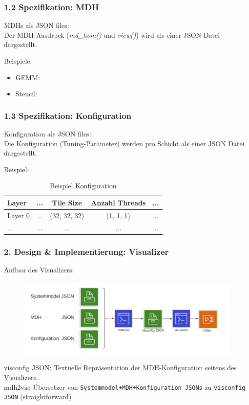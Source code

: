 \documentclass{presentation}
\begin{document}
\begin{frame}[allowframebreaks]
	\frametitle{1.2 Spezifikation: MDH}
	MDHs als JSON files:\\
	Der MDH-Ausdruck (\emph{md\_hom()} und \emph{view()}) wird als einer JSON Datei dargestellt.
	
	\bigskip
	
	Beispiele:
	\begin{itemize}
		\item GEMM:
		
		\framebreak
		\item Stencil:
		
	\end{itemize}
\end{frame}

\begin{frame}
	\frametitle{1.3 Spezifikation: Konfiguration}
	Konfiguration als JSON files:\\
	Die Konfiguration (Tuning-Parameter) werden pro Schicht als einer JSON Datei dargestellt.
	
	\bigskip
	
	Beispiel:\\
	
	\begin{table}
		\begin{tabular}{l | c | c | c | c }
			Layer & ... & Tile Size & Anzahl Threads & ... \\
			\hline \hline
			Layer 0 & ... & (32, 32, 32) & (1, 1, 1) & ... \\
			\hline
			... & ... & ... & ... & ... \\
		\end{tabular}
		\caption{Beispiel Konfiguration}
	\end{table}
	
	
\end{frame}

\begin{frame}
	\frametitle{2. Design \& Implementierung: Visualizer}
	Aufbau des Visualizers:
	\begin{figure}
		\includegraphics[scale=0.5]{images/visualizer_aufbau_praezise.png}
	\end{figure}
	
	visconfig JSON: Textuelle Repräsentation der MDH-Konfiguration seitens des Visualizers..\\
	mdh2vis: Übersetzer von \texttt{Systemmodel+MDH+Konfiguration JSONs} zu \texttt{visconfig JSON} (straightforward)
\end{frame}
\end{document}
